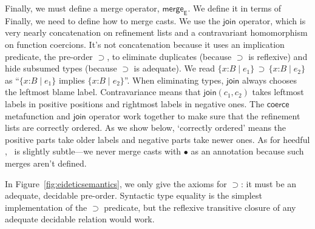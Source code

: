 \documentclass[9pt]{extarticle}
\newcommand{\ottnt}[1]{\mathit{#1}}
\begin{document}
\iffull
Finally, we must define a merge operator, $ \mathsf{merge} _{ \mathsf{E} }$. We
define it in terms of
\else
Finally, we need to define how to merge casts. We use
\fi the $ \mathsf{join} $ operator, which is very nearly
concatenation on refinement lists and a contravariant homomorphism on
function coercions. It's not concatenation because it uses an
implication predicate, the pre-order $ \supset $, to eliminate
duplicates (because $ \supset $ is reflexive) and hide
subsumed types (because $ \supset $ is adequate). We
read $ \{ \mathit{x} \mathord{:} \ottnt{B} \mathrel{\mid} \ottnt{e_{{\mathrm{1}}}} \}  \, \supset \,  \{ \mathit{x} \mathord{:} \ottnt{B} \mathrel{\mid} \ottnt{e_{{\mathrm{2}}}} \} $ as ``$ \{ \mathit{x} \mathord{:} \ottnt{B} \mathrel{\mid} \ottnt{e_{{\mathrm{1}}}} \} $ implies
$ \{ \mathit{x} \mathord{:} \ottnt{B} \mathrel{\mid} \ottnt{e_{{\mathrm{2}}}} \} $''.
When eliminating types, $ \mathsf{join} $ always chooses the leftmost blame
label. Contravariance means that $ \mathsf{join} ( \ottnt{c_{{\mathrm{1}}}} , \ottnt{c_{{\mathrm{2}}}} ) $ takes leftmost labels
in positive positions and rightmost labels in negative ones.
The $ \mathsf{coerce} $ metafunction and $ \mathsf{join} $ operator work together to
make sure that the refinement lists are correctly ordered.
As we show below, `correctly ordered' means the positive parts take
older labels and negative parts take newer ones.
\iffull As for heedful \lambdah, \fi \ECastMerge\ is slightly subtle---we never
merge casts with $ \bullet $ as an annotation because such merges
aren't defined.

In Figure~\ref{fig:eideticsemantics}, we only give the axioms for
$ \supset $: it must be an adequate, decidable pre-order. Syntactic
type equality is the simplest implementation of the $ \supset $ predicate, but
the reflexive transitive closure of any adequate decidable relation
would work.
\end{document}
